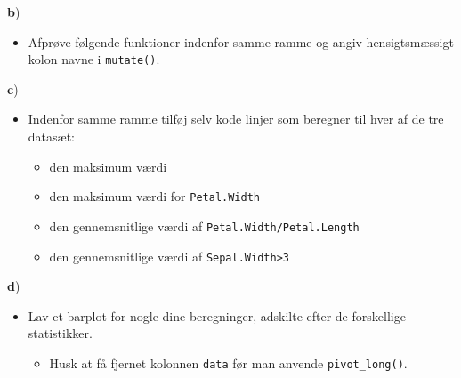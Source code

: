 \documentclass[
]{book}
\newenvironment{Shaded}{\begin{snugshade}}{\end{snugshade}}
\newcommand{\ErrorTok}[1]{\textcolor[rgb]{0.64,0.00,0.00}{\textbf{#1}}}
\newcommand{\FunctionTok}[1]{\textcolor[rgb]{0.00,0.00,0.00}{#1}}
\newcommand{\NormalTok}[1]{#1}
\newcommand{\OtherTok}[1]{\textcolor[rgb]{0.56,0.35,0.01}{#1}}
\newcommand{\SpecialCharTok}[1]{\textcolor[rgb]{0.00,0.00,0.00}{#1}}
\providecommand{\tightlist}{%
  \setlength{\itemsep}{0pt}\setlength{\parskip}{0pt}}
\begin{document}
\textbf{b})

\begin{itemize}
\tightlist
\item
  Afprøve følgende funktioner indenfor samme ramme og angiv hensigtsmæssigt kolon navne i \texttt{mutate()}.
\end{itemize}

\begin{Shaded}
\end{Shaded}

\textbf{c})

\begin{itemize}
\tightlist
\item
  Indenfor samme ramme tilføj selv kode linjer som beregner til hver af de tre datasæt:

  \begin{itemize}
  \tightlist
  \item
    den maksimum værdi
  \item
    den maksimum værdi for \texttt{Petal.Width}
  \item
    den gennemsnitlige værdi af \texttt{Petal.Width/Petal.Length}
  \item
    den gennemsnitlige værdi af \texttt{Sepal.Width\textgreater{}3}
  \end{itemize}
\end{itemize}

\textbf{d})

\begin{itemize}
\tightlist
\item
  Lav et barplot for nogle dine beregninger, adskilte efter de forskellige statistikker.

  \begin{itemize}
  \tightlist
  \item
    Husk at få fjernet kolonnen \texttt{data} før man anvende \texttt{pivot\_long()}.
  \end{itemize}
\end{itemize}
\end{document}
